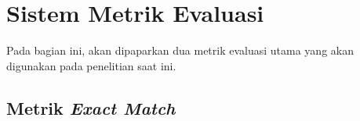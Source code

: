 \section{Sistem Metrik Evaluasi}
Pada bagian ini, akan dipaparkan dua metrik evaluasi utama yang akan digunakan pada penelitian saat ini.

\subsection{Metrik \emph{Exact Match}}

